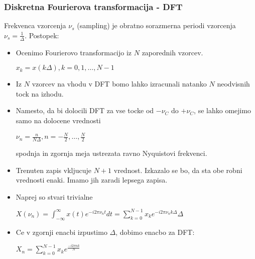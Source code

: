 \documentclass{article}
\begin{document}
\begin{multicols}{4}
	\subsubsection{Diskretna Fourierova transformacija - DFT}
	Frekvenca vzorcenja $\nu_s $ (sampling) je obratno sorazmerna periodi vzorcenja $\nu_s = \frac{1}{\Delta}$.
	Postopek:
	\begin{itemize}
		\item Ocenimo Fourierovo transformacijo iz $N$ zaporednih vzorcev.
		      \begin{center}
			      \begin{math}
				      x_k = x(k \Delta), k = 0,1, \dots, N - 1
			      \end{math}
		      \end{center}
		\item Iz $N$ vzorcev na vhodu v DFT bomo lahko izracunali natanko $N$ neodvisnih tock na izhodu.
		\item Namesto, da bi dolocili DFT za vse tocke od $- \nu_C$ do $+ \nu_C$, se lahko omejimo samo
		      na dolocene vrednosti
		      \begin{center}
			      \begin{math}
				      \nu_n = \frac{n}{N \Delta}, n = - \frac{N}{2}, \dots, \frac{N}{2}
			      \end{math}
		      \end{center}
		      spodnja in zgornja meja ustrezata ravno Nyquistovi frekvenci.
		\item Trenuten zapis vkljucuje $N + 1$ vrednost. Izkazalo se bo, da sta obe robni vrednosti enaki. Imamo
		      jih zaradi lepsega zapisa.
		\item Naprej so stvari trivialne
		      \begin{center}
			      \begin{math}
				      X(\nu_n) = \int_{-\infty}^{\infty} x(t) e^{-i2 \pi \nu_n t} dt = \sum^{N-1}_{k=0} x_k e^{-i2 \pi \nu_n k \Delta} \Delta
			      \end{math}
		      \end{center}
		\item Ce v zgornji enacbi izpustimo $\Delta$, dobimo enacbo za DFT:
		      \begin{center}
			      \begin{math}
				      X_n = \sum_{k=0}^{N-1} x_k e^{\frac{-i2 \pi n k}{N}}
			      \end{math}
		      \end{center}
	\end{itemize}


\end{multicols}
\end{document}
